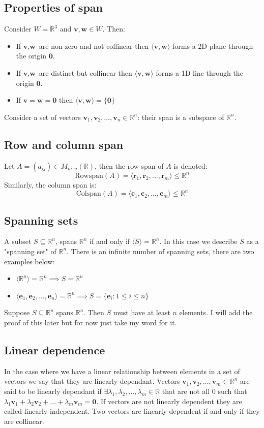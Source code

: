\documentclass[12pt]{article}
\newcommand{\arbvec}[2]{\ensuremath{\textbf{#1}_1,\textbf{#1}_2,\dots,\textbf{#1}_{#2}}}
\newcommand{\arbreal}[2]{{#1}_1,{#1}_2,\dots,{#1}_{#2}}
\begin{document}
\subsection*{Properties of span}
Consider \(W=\mathbb{R}^3\) and \(\textbf{v},\textbf{w}\in W\). Then:
\begin{itemize}
    \item If \(\textbf{v},\textbf{w}\) are non-zero and not collinear then \(\langle\textbf{v},\textbf{w}\rangle\) forms a 2D plane through the origin \(\textbf{0}\).
    \item If \(\textbf{v},\textbf{w}\) are distinct but collinear then \(\langle\textbf{v},\textbf{w}\rangle\) forms a 1D line through the origin \(\textbf{0}\).
    \item If \(\textbf{v}=\textbf{w}=\textbf{0}\) then \(\langle\textbf{v},\textbf{w}\rangle=\{\textbf{0}\}\)
\end{itemize}
Consider a set of vectors \(\textbf{v}_1,\textbf{v}_2,...,\textbf{v}_n\in\mathbb{R}^n\): their span is a subspace of \(\mathbb{R}^n\).
\subsection*{Row and column span}
Let \(A=(a_{ij})\in M_{m,n}(\mathbb{R})\), then the row span of \(A\) is denoted:
\[\text{Rowspan}(A)=\langle\textbf{r}_1,\textbf{r}_2,...,\textbf{r}_m\rangle\leqslant\mathbb{R}^n\]
Similarly, the column span is:
\[\text{Colspan}(A)=\langle\textbf{c}_1,\textbf{c}_2,...,\textbf{c}_m\rangle\leqslant \mathbb{R}^n\]
\subsection*{Spanning sets}
A subset \(S\subseteq\mathbb{R}^n\), spans \(\mathbb{R}^n\) if and only if \(\langle S\rangle=\mathbb{R}^n\). In this case we describe \(S\) as a "spanning set" of \(\mathbb{R}^n\). There is an infinite number of spanning sets, there are two examples below:
\begin{itemize}
    \item \(\langle\mathbb{R}^n\rangle=\mathbb{R}^n\implies S=\mathbb{R}^n\)
    \item \(\langle \textbf{e}_1,\textbf{e}_2,...,\textbf{e}_n\rangle=\mathbb{R}^n\implies S=\{\textbf{e}_i:1\leq i \leq n\}\)
\end{itemize}
Suppose \(S\subseteq\mathbb{R}^n\) spans \(\mathbb{R}^n\). Then \(S\) must have at least \(n\) elements. I will add the proof of this later but for now just take my word for it.
\subsection*{Linear dependence}
In the case where we have a linear relationship between elements in a set of vectors we say that they are linearly dependant. Vectors \(\arbvec{v}{m}\in\mathbb{R}^n\) are said to be linearly dependant if \(\exists\arbreal{\lambda}{m}\in\mathbb{R}\) that are not all \(0\) such that \(\lambda_1\textbf{v}_1+\lambda_2\textbf{v}_2+\dots+\lambda_m\textbf{v}_m=\textbf{0}\). If vectors are not linearly dependent they are called linearly independent. Two vectors are linearly dependent if and only if they are collinear.
\end{document}
